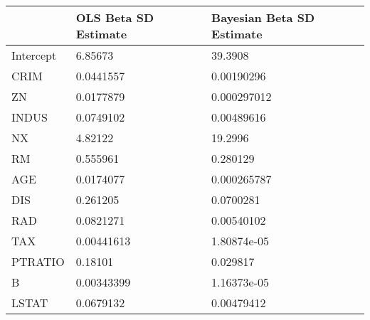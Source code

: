 \begin{tabular}{lll}
\hline
           & OLS Beta SD Estimate   & Bayesian Beta SD Estimate   \\
\hline
 Intercept & 6.85673                & 39.3908                     \\
 CRIM      & 0.0441557              & 0.00190296                  \\
 ZN        & 0.0177879              & 0.000297012                 \\
 INDUS     & 0.0749102              & 0.00489616                  \\
 NX        & 4.82122                & 19.2996                     \\
 RM        & 0.555961               & 0.280129                    \\
 AGE       & 0.0174077              & 0.000265787                 \\
 DIS       & 0.261205               & 0.0700281                   \\
 RAD       & 0.0821271              & 0.00540102                  \\
 TAX       & 0.00441613             & 1.80874e-05                 \\
 PTRATIO   & 0.18101                & 0.029817                    \\
 B         & 0.00343399             & 1.16373e-05                 \\
 LSTAT     & 0.0679132              & 0.00479412                  \\
\hline
\end{tabular}